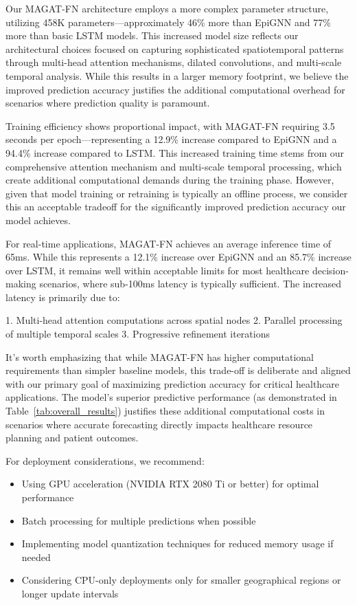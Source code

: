 \documentclass[lettersize, journal]{IEEEtran}
\begin{document}
Our MAGAT-FN architecture employs a more complex parameter structure, utilizing 458K parameters—approximately 46\% more than EpiGNN and 77\% more than basic LSTM models. This increased model size reflects our architectural choices focused on capturing sophisticated spatiotemporal patterns through multi-head attention mechanisms, dilated convolutions, and multi-scale temporal analysis. While this results in a larger memory footprint, we believe the improved prediction accuracy justifies the additional computational overhead for scenarios where prediction quality is paramount.

Training efficiency shows proportional impact, with MAGAT-FN requiring 3.5 seconds per epoch—representing a 12.9\% increase compared to EpiGNN and a 94.4\% increase compared to LSTM. This increased training time stems from our comprehensive attention mechanism and multi-scale temporal processing, which create additional computational demands during the training phase. However, given that model training or retraining is typically an offline process, we consider this an acceptable tradeoff for the significantly improved prediction accuracy our model achieves.

For real-time applications, MAGAT-FN achieves an average inference time of 65ms. While this represents a 12.1\% increase over EpiGNN and an 85.7\% increase over LSTM, it remains well within acceptable limits for most healthcare decision-making scenarios, where sub-100ms latency is typically sufficient. The increased latency is primarily due to:

1. Multi-head attention computations across spatial nodes
2. Parallel processing of multiple temporal scales
3. Progressive refinement iterations

It's worth emphasizing that while MAGAT-FN has higher computational requirements than simpler baseline models, this trade-off is deliberate and aligned with our primary goal of maximizing prediction accuracy for critical healthcare applications. The model's superior predictive performance (as demonstrated in Table~\ref{tab:overall_results}) justifies these additional computational costs in scenarios where accurate forecasting directly impacts healthcare resource planning and patient outcomes.

For deployment considerations, we recommend:

\begin{itemize}
    \item Using GPU acceleration (NVIDIA RTX 2080 Ti or better) for optimal performance
    \item Batch processing for multiple predictions when possible
    \item Implementing model quantization techniques for reduced memory usage if needed
    \item Considering CPU-only deployments only for smaller geographical regions or longer update intervals
\end{itemize}
\end{document}
